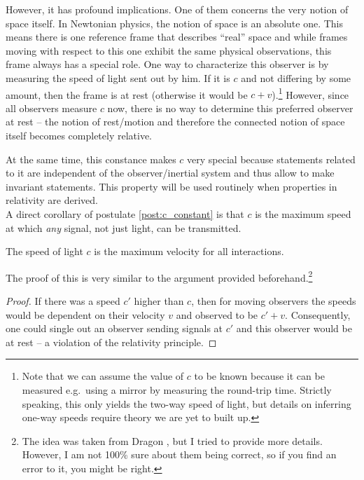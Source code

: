 However, it has profound implications. One of them concerns the very notion of space itself. In Newtonian physics, the notion of space is an absolute one. This means there is one reference frame that describes \enquote{real} space and while frames moving with respect to this one exhibit the same physical observations, this frame always has a special role. One way to characterize this observer is by measuring the speed of light sent out by him. If it is $c$ and not differing by some amount, then the frame is at rest (otherwise it would be $c + v$).\footnote{Note that we can assume the value of $c$ to be known because it can be measured e.g.~using a mirror by measuring the round-trip time. Strictly speaking, this only yields the two-way speed of light, but details on inferring one-way speeds require theory we are yet to built up.} However, since all observers measure $c$ now, there is no way to determine this preferred observer at rest -- the notion of rest/motion and therefore the connected notion of space itself becomes completely relative.


At the same time, this constance makes $c$ very special because statements related to it are independent of the observer/inertial system and thus allow to make invariant statements. This property will be used routinely when properties in relativity are derived.\\



A direct corollary of postulate \ref{post:c_constant} is that $c$ is the maximum speed at which \emph{any} signal, not just light, can be transmitted.
\begin{prop}%
	The speed of light $c$ is the maximum velocity for all interactions.
\end{prop}
The proof of this is very similar to the argument provided beforehand.\footnote{The idea was taken from Dragon \cite{dragon_geometry_srt}, but I tried to provide more details. However, I am not 100\% sure about them being correct, so if you find an error to it, you might be right.}
\begin{proof}
	If there was a speed $c'$ higher than $c$, then for moving observers the speeds would be dependent on their velocity $v$ and observed to be $c' + v$. Consequently, one could single out an observer sending signals at $c'$ and this observer would be at rest -- a violation of the relativity principle.
\end{proof}

